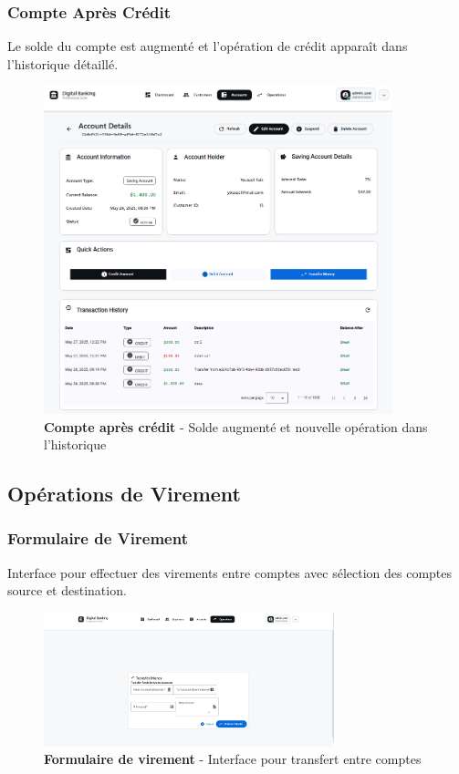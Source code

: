 \documentclass[11pt, a4paper]{article}
\begin{document}
\subsubsection{Compte Après Crédit}

Le solde du compte est augmenté et l'opération de crédit apparaît dans l'historique détaillé.

\begin{figure}[H]
    \centering
    \includegraphics[width=0.9\textwidth]{screenshots/06_06_account_details_after_credit.png}
    \caption{\textbf{Compte après crédit} - Solde augmenté et nouvelle opération dans l'historique}
    \label{fig:account_details_after_credit}
\end{figure}

\subsection{Opérations de Virement}

\subsubsection{Formulaire de Virement}

Interface pour effectuer des virements entre comptes avec sélection des comptes source et destination.

\begin{figure}[H]
    \centering
    \includegraphics[width=0.75\textwidth]{screenshots/06_07_operation_transfer_form_empty.png}
    \caption{\textbf{Formulaire de virement} - Interface pour transfert entre comptes}
    \label{fig:operation_transfer_form_empty}
\end{figure}
\end{document}
